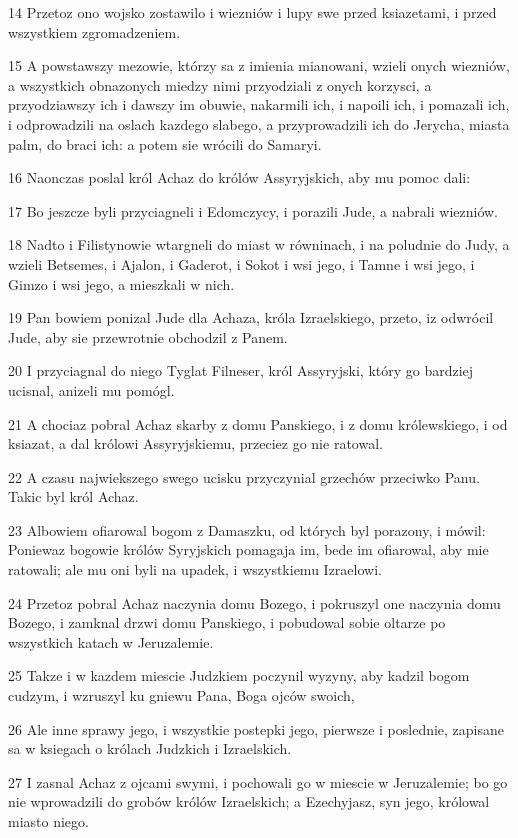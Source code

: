 \par 14 Przetoz ono wojsko zostawilo i wiezniów i lupy swe przed ksiazetami, i przed wszystkiem zgromadzeniem.
\par 15 A powstawszy mezowie, którzy sa z imienia mianowani, wzieli onych wiezniów, a wszystkich obnazonych miedzy nimi przyodziali z onych korzysci, a przyodziawszy ich i dawszy im obuwie, nakarmili ich, i napoili ich, i pomazali ich, i odprowadzili na oslach kazdego slabego, a przyprowadzili ich do Jerycha, miasta palm, do braci ich: a potem sie wrócili do Samaryi.
\par 16 Naonczas poslal król Achaz do królów Assyryjskich, aby mu pomoc dali:
\par 17 Bo jeszcze byli przyciagneli i Edomczycy, i porazili Jude, a nabrali wiezniów.
\par 18 Nadto i Filistynowie wtargneli do miast w równinach, i na poludnie do Judy, a wzieli Betsemes, i Ajalon, i Gaderot, i Sokot i wsi jego, i Tamne i wsi jego, i Gimzo i wsi jego, a mieszkali w nich.
\par 19 Pan bowiem ponizal Jude dla Achaza, króla Izraelskiego, przeto, iz odwrócil Jude, aby sie przewrotnie obchodzil z Panem.
\par 20 I przyciagnal do niego Tyglat Filneser, król Assyryjski, który go bardziej ucisnal, anizeli mu pomógl.
\par 21 A chociaz pobral Achaz skarby z domu Panskiego, i z domu królewskiego, i od ksiazat, a dal królowi Assyryjskiemu, przeciez go nie ratowal.
\par 22 A czasu najwiekszego swego ucisku przyczynial grzechów przeciwko Panu. Takic byl król Achaz.
\par 23 Albowiem ofiarowal bogom z Damaszku, od których byl porazony, i mówil: Poniewaz bogowie królów Syryjskich pomagaja im, bede im ofiarowal, aby mie ratowali; ale mu oni byli na upadek, i wszystkiemu Izraelowi.
\par 24 Przetoz pobral Achaz naczynia domu Bozego, i pokruszyl one naczynia domu Bozego, i zamknal drzwi domu Panskiego, i pobudowal sobie oltarze po wszystkich katach w Jeruzalemie.
\par 25 Takze i w kazdem miescie Judzkiem poczynil wyzyny, aby kadzil bogom cudzym, i wzruszyl ku gniewu Pana, Boga ojców swoich,
\par 26 Ale inne sprawy jego, i wszystkie postepki jego, pierwsze i poslednie, zapisane sa w ksiegach o królach Judzkich i Izraelskich.
\par 27 I zasnal Achaz z ojcami swymi, i pochowali go w miescie w Jeruzalemie; bo go nie wprowadzili do grobów królów Izraelskich; a Ezechyjasz, syn jego, królowal miasto niego.

